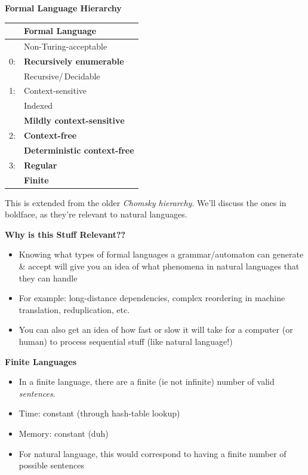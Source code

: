 \documentclass{beamer}
\newcommand{\pagestepalt}[2]{
  \begin{frame}[t]
    \begin{minipage}[t][0.26\textheight][t]{\textwidth}
      \begin{center}
        \huge
        \textbf{#1}
      \end{center}
    \end{minipage}
    
    \begin{minipage}[t][0.7\textheight][c]{\textwidth}
      #2
    \end{minipage}
  \end{frame}
}
\begin{document}
\pagestepalt{Formal Language Hierarchy}{
\begin{center}
\begin{tabular}{|ll|}
\hline
& Formal Language \\
\hline
\hline
& Non-Turing-acceptable\\
\hline
0: & \bf Recursively enumerable \\
\hline
& Recursive/\,Decidable \\
\hline
1: & Context-sensitive \\
\hline
& Indexed \\
\hline
& \bf Mildly context-sensitive \\
\hline
2: & \bf Context-free \\
\hline
& \bf Deterministic context-free \\
\hline
3: & \bf Regular \\
\hline
& \bf Finite \\
\hline
\end{tabular}
\end{center}
\pause
\footnotesize{This is extended from the older \textit{Chomsky hierarchy}. \pause We'll discuss the ones in boldface, as they're relevant to natural languages.}
}


\pagestepalt{Why is this Stuff Relevant??}{
\begin{block}{}
\begin{itemize}
	\item Knowing what types of formal languages a grammar/automaton can generate \& accept will give you an idea of what phenomena in natural languages that they can handle
	\pause
	\item For example: long-distance dependencies, complex reordering in machine translation, reduplication, etc.
	\pause
	\item You can also get an idea of how fast or slow it will take for a computer (or human) to process sequential stuff (like natural language!)
\end{itemize}
\end{block}
}


\pagestepalt{Finite Languages}{
\begin{block}{}
\begin{itemize}
	\item In a finite language, there are a finite (ie not infinite) number of valid \textit{sentences}.
	\item Time: constant (through hash-table lookup)
	\item Memory: constant (duh)
	\pause
	\item For natural language, this would correspond to having a finite number of possible sentences
\end{itemize}
\end{block}
}
\end{document}
